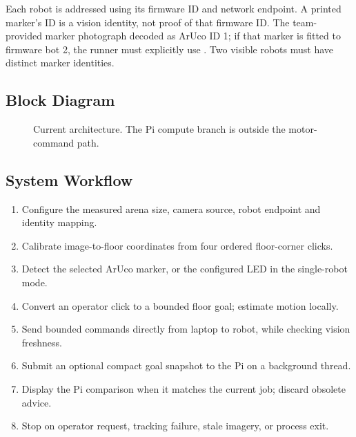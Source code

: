 \documentclass[11pt,a4paper]{article}
\newcommand{\code}[1]{\texttt{\detokenize{#1}}}
\begin{document}
Each robot is addressed using its firmware ID and network endpoint. A printed
marker's ID is a vision identity, not proof of that firmware ID. The team-provided
marker photograph decoded as ArUco ID 1; if that marker is fitted to firmware bot 2,
the runner must explicitly use \code{--bot 2 --marker-id 1}. Two visible robots
must have distinct marker identities.

\subsection{Block Diagram}
\begin{figure}[ht]\centering
{}
\caption{Current architecture. The Pi compute branch is outside the motor-command path.}
\end{figure}

\subsection{System Workflow}
\begin{enumerate}
\item Configure the measured arena size, camera source, robot endpoint and identity mapping.
\item Calibrate image-to-floor coordinates from four ordered floor-corner clicks.
\item Detect the selected ArUco marker, or the configured LED in the single-robot mode.
\item Convert an operator click to a bounded floor goal; estimate motion locally.
\item Send bounded commands directly from laptop to robot, while checking vision freshness.
\item Submit an optional compact goal snapshot to the Pi on a background thread.
\item Display the Pi comparison when it matches the current job; discard obsolete advice.
\item Stop on operator request, tracking failure, stale imagery, or process exit.
\end{enumerate}
\end{document}

